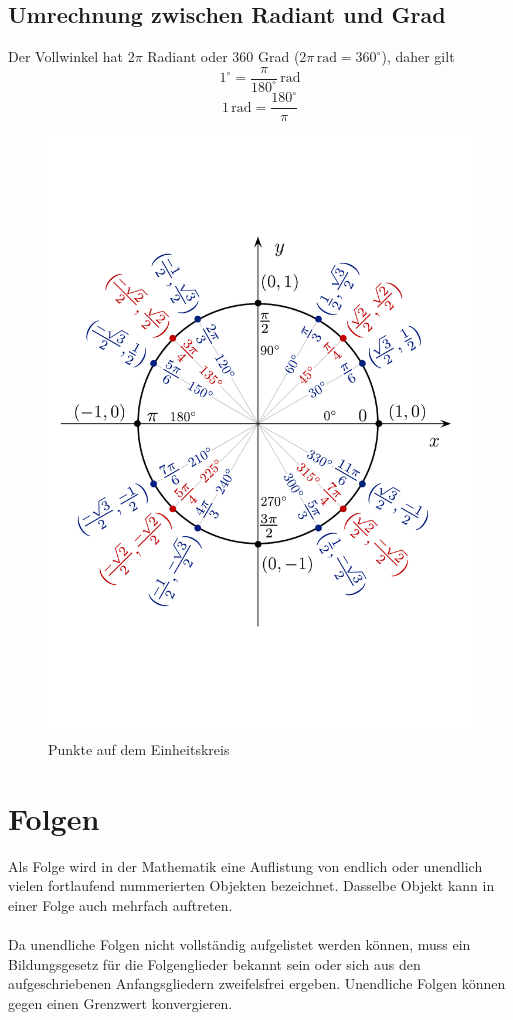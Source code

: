 \documentclass[a4paper]{article}
\begin{document}
\subsection{Umrechnung zwischen Radiant und Grad}
Der Vollwinkel hat $2 \pi$ Radiant oder 360 Grad ($ 2\pi\,\mathrm{rad} = 360^\circ $), daher gilt
\[1^\circ = \frac{\pi}{180^\circ} \,\mathrm{rad} \]
\[1\,\mathrm{rad} = \frac{180^\circ}{\pi}\]

\begin{figure}[h!]
\centering
\includegraphics[width=1.1\textwidth]{images/einheitskreis}\caption{\label{fig:einheitskreis}{Punkte auf dem Einheitskreis}}
\end{figure}

\section{Folgen}
Als Folge wird in der Mathematik eine Auflistung von endlich oder unendlich vielen fortlaufend nummerierten Objekten bezeichnet. Dasselbe Objekt kann in einer Folge auch mehrfach auftreten. \\\\
Da unendliche Folgen nicht vollständig aufgelistet werden können, muss ein Bildungsgesetz für die Folgenglieder bekannt sein oder sich aus den aufgeschriebenen Anfangsgliedern zweifelsfrei ergeben. Unendliche Folgen können gegen einen Grenzwert konvergieren.
\end{document}
